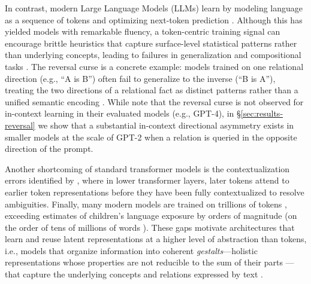 \documentclass{article}
\begin{document}
In contrast, modern Large Language Models (LLMs) learn by modeling language as a sequence of tokens and optimizing next-token prediction \citep{openai2023gpt4,deepseekv3,llama3_2024}. Although this has yielded models with remarkable fluency, a token-centric training signal can encourage brittle heuristics that capture surface-level statistical patterns rather than underlying concepts, leading to failures in generalization and compositional tasks \citep{bender2020climbing,dziri2024faithandfate,mirzadeh2024gsmsymbolic}. The reversal curse is a concrete example: models trained on one relational direction (e.g., ``A is B'') often fail to generalize to the inverse (``B is A''), treating the two directions of a relational fact as distinct patterns rather than a unified semantic encoding \citep{berglund2024reversal,lin2024delving}. While \citet{berglund2024reversal} note that the reversal curse is not observed for in-context learning in their evaluated models (e.g., GPT-4), in \S\ref{sec:results-reversal} we show that a substantial in-context directional asymmetry exists in smaller models at the scale of GPT-2 when a relation is queried in the opposite direction of the prompt.




Another shortcoming of standard transformer models is the contextualization errors identified by \citet{lepori2024racingthoughts}, where in lower transformer layers, later tokens attend to earlier token representations before they have been fully contextualized to resolve ambiguities. Finally, many modern models are trained on trillions of tokens \citep{deepseekv3}, exceeding estimates of children’s language exposure by orders of magnitude (on the order of tens of millions of words \citep{hart_risley_1995_wordgap}). These gaps motivate architectures that learn and reuse latent representations at a higher level of abstraction than tokens, i.e., models that organize information into coherent \emph{gestalts}—holistic representations whose properties are not reducible to the sum of their parts \citep{werthiemer1938gestalt}—that capture the underlying concepts and relations expressed by text \citep{mcclelland2020placing,glenberg1987mental}.
\end{document}
